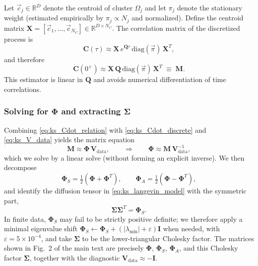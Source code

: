 \documentclass[%
  prl,
  reprint,
  amsmath,
  amssymb,
  aps
]{revtex4-2}
\newcommand{\vvec}[1]{\vec{#1}}
\begin{document}
Let $\vvec{c}_j\in\mathbb{R}^{D}$ denote the centroid of cluster $\Omega_j$ and let $\pi_j$ denote the stationary weight (estimated empirically by $\pi_j\propto N_j$ and normalized). Define the centroid matrix $\bm{X}=[\vvec{c}_1,\dots,\vvec{c}_{N_C}]\in\mathbb{R}^{D\times N_C}$. The correlation matrix of the discretized process is
\begin{equation}
\bm{C}(\tau)\approx \bm{X}\,e^{\bm{Q}\tau}\,\mathrm{diag}(\vvec{\pi})\,\bm{X}^T,
\label{eq:ks_C_discrete}
\end{equation}
and therefore
\begin{equation}
\dot{\bm{C}}(0^+)
\approx
\bm{X}\,\bm{Q}\,\mathrm{diag}(\vvec{\pi})\,\bm{X}^T
\;\equiv\;\bm{M}.
\label{eq:ks_Cdot_discrete}
\end{equation}
This estimator is linear in $\bm{Q}$ and avoids numerical differentiation of time correlations.

\subsubsection{Solving for \texorpdfstring{$\bm{\Phi}$}{Phi} and extracting \texorpdfstring{$\bm{\Sigma}$}{Sigma}}
\label{sec:ks_phi_sigma_solver}

Combining \eqref{eq:ks_Cdot_relation} with \eqref{eq:ks_Cdot_discrete} and \eqref{eq:ks_V_data} yields the matrix equation
\begin{equation}
\bm{M}\approx \bm{\Phi}\,\bm{V}_{\mathrm{data}},
\qquad\Rightarrow\qquad
\bm{\Phi}\approx \bm{M}\,\bm{V}_{\mathrm{data}}^{-1},
\label{eq:ks_phi_solver}
\end{equation}
which we solve by a linear solve (without forming an explicit inverse). We then decompose
\begin{equation}
\bm{\Phi}_S=\tfrac12(\bm{\Phi}+\bm{\Phi}^T),
\qquad
\bm{\Phi}_A=\tfrac12(\bm{\Phi}-\bm{\Phi}^T),
\end{equation}
and identify the diffusion tensor in \eqref{eq:ks_langevin_model} with the symmetric part,
\begin{equation}
\bm{\Sigma}\bm{\Sigma}^T=\bm{\Phi}_S.
\label{eq:ks_sigma_relation}
\end{equation}
In finite data, $\bm{\Phi}_S$ may fail to be strictly positive definite; we therefore apply a minimal eigenvalue shift $\bm{\Phi}_S\leftarrow \bm{\Phi}_S+(\lvert\lambda_{\min}\rvert+\varepsilon)\bm{I}$ when needed, with $\varepsilon=5\times10^{-4}$, and take $\bm{\Sigma}$ to be the lower-triangular Cholesky factor. The matrices shown in Fig.~2 of the main text are precisely $\bm{\Phi}$, $\bm{\Phi}_S$, $\bm{\Phi}_A$, and this Cholesky factor $\bm{\Sigma}$, together with the diagnostic $\bm{V}_{\mathrm{data}}\approx -\bm{I}$.
\end{document}
